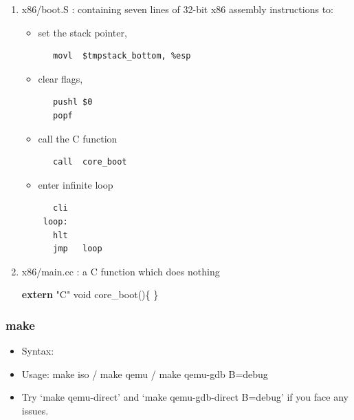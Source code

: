 \documentclass[]{book}
\newenvironment{Shaded}{}{}
\newcommand{\KeywordTok}[1]{\textbf{{#1}}}
\newcommand{\DataTypeTok}[1]{\textcolor[rgb]{0.50,0.00,0.00}{{#1}}}
\newcommand{\StringTok}[1]{\textcolor[rgb]{0.87,0.00,0.00}{{#1}}}
\newcommand{\NormalTok}[1]{{#1}}
\begin{document}
\begin{enumerate}
\def\labelenumi{\arabic{enumi}.}
\item
  x86/boot.S : containing seven lines of 32-bit x86 assembly
  instructions to:

  \begin{itemize}
  \item
    set the stack pointer,

\begin{verbatim}
   movl  $tmpstack_bottom, %esp
\end{verbatim}
  \item
    clear flags,

\begin{verbatim}
   pushl $0
   popf
\end{verbatim}
  \item
    call the C function

\begin{verbatim}
   call  core_boot
\end{verbatim}
  \item
    enter infinite loop

\begin{verbatim}
   cli
 loop:
   hlt
   jmp   loop
\end{verbatim}
  \end{itemize}
\item
  x86/main.cc : a C function which does nothing

\begin{Shaded}
\begin{Highlighting}[]
 \KeywordTok{extern} \StringTok{"C"} \DataTypeTok{void} \NormalTok{core_boot()\{}
 \NormalTok{\}}
\end{Highlighting}
\end{Shaded}
\end{enumerate}

\subsubsection*{make}\label{make}

\begin{itemize}
\item
  Syntax:

\begin{Shaded}
\end{Shaded}
\item
  Usage: make iso / make qemu / make qemu-gdb B=debug
\item
  Try `make qemu-direct' and `make qemu-gdb-direct B=debug' if you face
  any issues.
\end{itemize}
\end{document}
